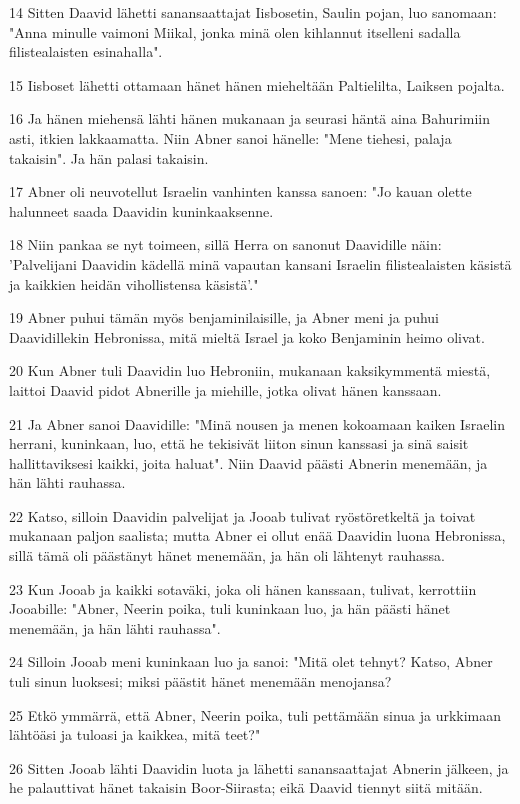 \par 14 Sitten Daavid lähetti sanansaattajat Iisbosetin, Saulin pojan, luo sanomaan: "Anna minulle vaimoni Miikal, jonka minä olen kihlannut itselleni sadalla filistealaisten esinahalla".
\par 15 Iisboset lähetti ottamaan hänet hänen mieheltään Paltielilta, Laiksen pojalta.
\par 16 Ja hänen miehensä lähti hänen mukanaan ja seurasi häntä aina Bahurimiin asti, itkien lakkaamatta. Niin Abner sanoi hänelle: "Mene tiehesi, palaja takaisin". Ja hän palasi takaisin.
\par 17 Abner oli neuvotellut Israelin vanhinten kanssa sanoen: "Jo kauan olette halunneet saada Daavidin kuninkaaksenne.
\par 18 Niin pankaa se nyt toimeen, sillä Herra on sanonut Daavidille näin: 'Palvelijani Daavidin kädellä minä vapautan kansani Israelin filistealaisten käsistä ja kaikkien heidän vihollistensa käsistä'."
\par 19 Abner puhui tämän myös benjaminilaisille, ja Abner meni ja puhui Daavidillekin Hebronissa, mitä mieltä Israel ja koko Benjaminin heimo olivat.
\par 20 Kun Abner tuli Daavidin luo Hebroniin, mukanaan kaksikymmentä miestä, laittoi Daavid pidot Abnerille ja miehille, jotka olivat hänen kanssaan.
\par 21 Ja Abner sanoi Daavidille: "Minä nousen ja menen kokoamaan kaiken Israelin herrani, kuninkaan, luo, että he tekisivät liiton sinun kanssasi ja sinä saisit hallittaviksesi kaikki, joita haluat". Niin Daavid päästi Abnerin menemään, ja hän lähti rauhassa.
\par 22 Katso, silloin Daavidin palvelijat ja Jooab tulivat ryöstöretkeltä ja toivat mukanaan paljon saalista; mutta Abner ei ollut enää Daavidin luona Hebronissa, sillä tämä oli päästänyt hänet menemään, ja hän oli lähtenyt rauhassa.
\par 23 Kun Jooab ja kaikki sotaväki, joka oli hänen kanssaan, tulivat, kerrottiin Jooabille: "Abner, Neerin poika, tuli kuninkaan luo, ja hän päästi hänet menemään, ja hän lähti rauhassa".
\par 24 Silloin Jooab meni kuninkaan luo ja sanoi: "Mitä olet tehnyt? Katso, Abner tuli sinun luoksesi; miksi päästit hänet menemään menojansa?
\par 25 Etkö ymmärrä, että Abner, Neerin poika, tuli pettämään sinua ja urkkimaan lähtöäsi ja tuloasi ja kaikkea, mitä teet?"
\par 26 Sitten Jooab lähti Daavidin luota ja lähetti sanansaattajat Abnerin jälkeen, ja he palauttivat hänet takaisin Boor-Siirasta; eikä Daavid tiennyt siitä mitään.
